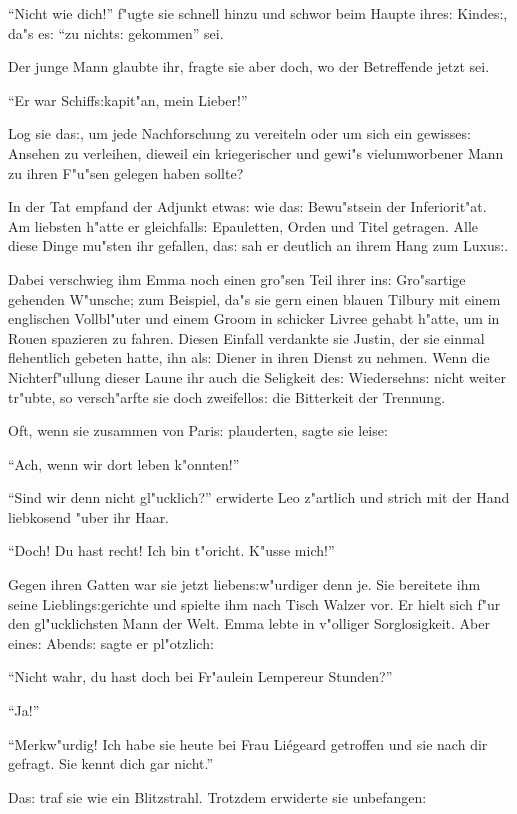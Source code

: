 \documentclass[oneside,12pt]{book}
\newcommand{\s}{s:}%
\begin{document}
"`Nicht wie dich!"' f"ugte sie schnell hinzu und schwor beim Haupte
ihre{\s} Kinde{\s}, da"s e{\s} "`zu nicht{\s} gekommen"' sei.

Der junge Mann glaubte ihr, fragte sie aber doch, wo der
Betreffende jetzt sei.

"`Er war Schiff{\s}kapit"an, mein Lieber!"'

Log sie da{\s}, um jede Nachforschung zu vereiteln oder um sich
ein gewisse{\s} Ansehen zu verleihen, dieweil ein kriegerischer
und gewi"s vielumworbener Mann zu ihren F"u"sen gelegen haben
sollte?

In der Tat empfand der Adjunkt etwa{\s} wie da{\s} Bewu"stsein der
Inferiorit"at. Am liebsten h"atte er gleichfall{\s} Epauletten,
Orden und Titel getragen. Alle diese Dinge mu"sten ihr gefallen,
da{\s} sah er deutlich an ihrem Hang zum Luxu{\s}.

Dabei verschwieg ihm Emma noch einen gro"sen Teil ihrer in{\s}
Gro"sartige gehenden W"unsche; zum Beispiel, da"s sie gern einen
blauen Tilbury mit einem englischen Vollbl"uter und einem Groom in
schicker Livree gehabt h"atte, um in Rouen spazieren zu fahren.
Diesen Einfall verdankte sie Justin, der sie einmal flehentlich
gebeten hatte, ihn al{\s} Diener in ihren Dienst zu nehmen. Wenn
die Nichterf"ullung dieser Laune ihr auch die Seligkeit de{\s}
Wiedersehn{\s} nicht weiter tr"ubte, so versch"arfte sie doch
zweifello{\s} die Bitterkeit der Trennung.

Oft, wenn sie zusammen von Pari{\s} plauderten, sagte sie leise:

"`Ach, wenn wir dort leben k"onnten!"'

"`Sind wir denn nicht gl"ucklich?"' erwiderte Leo z"artlich und
strich mit der Hand liebkosend "uber ihr Haar.

"`Doch! Du hast recht! Ich bin t"oricht. K"usse mich!"'

Gegen ihren Gatten war sie jetzt lieben{\s}w"urdiger denn je. Sie
bereitete ihm seine Liebling{\s}gerichte und spielte ihm nach
Tisch Walzer vor. Er hielt sich f"ur den gl"ucklichsten Mann der
Welt. Emma lebte in v"olliger Sorglosigkeit. Aber eine{\s}
Abend{\s} sagte er pl"otzlich:

"`Nicht wahr, du hast doch bei Fr"aulein Lempereur Stunden?"'

"`Ja!"'

"`Merkw"urdig! Ich habe sie heute bei Frau Li\'egeard getroffen
und sie nach dir gefragt. Sie kennt dich gar nicht."'

Da{\s} traf sie wie ein Blitzstrahl. Trotzdem erwiderte sie
unbefangen:
\end{document}
